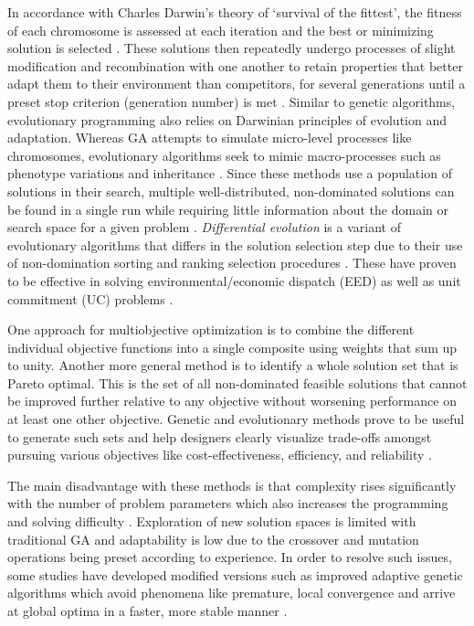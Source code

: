 \documentclass[final,3p,times]{elsarticle}
\begin{document}
In accordance with Charles Darwin's theory of `survival of the fittest', the fitness of each chromosome is assessed at each iteration and the best or minimizing solution is selected \cite{pathak2017}. These solutions then repeatedly undergo processes of slight modification and recombination with one another to retain properties that better adapt them to their environment than competitors, for several generations until a preset stop criterion (generation number) is met \cite{nemati2015}. Similar to genetic algorithms, evolutionary programming also relies on Darwinian principles of evolution and adaptation. Whereas GA attempts to simulate micro-level processes like chromosomes, evolutionary algorithms seek to mimic macro-processes such as phenotype variations and inheritance \cite{pathak2017}. Since these methods use a population of solutions in their search, multiple well-distributed, non-dominated solutions can be found in a single run while requiring little information about the domain or search space for a given problem \cite{Qu2018}. \textit{Differential evolution} is a variant of evolutionary algorithms that differs in the solution selection step due to their use of non-domination sorting and ranking selection procedures \cite{Qu2018}. These have proven to be effective in solving environmental/economic dispatch (EED) as well as unit commitment (UC) problems \cite{lu2011}.

One approach for multiobjective optimization is to combine the different individual objective functions into a single composite using weights that sum up to unity. Another more general method is to identify a whole solution set that is Pareto optimal. This is the set of all non-dominated feasible solutions that cannot be improved further relative to any objective without worsening performance on at least one other objective. Genetic and evolutionary methods prove to be useful to generate such sets and help designers clearly visualize trade-offs amongst pursuing various objectives like cost-effectiveness, efficiency, and reliability \cite{fadaee2012}.

The main disadvantage with these methods is that complexity rises significantly with the number of problem parameters which also increases the programming and solving difficulty \cite{fathima2015}. Exploration of new solution spaces is limited with traditional GA and adaptability is low due to the crossover and mutation operations being preset according to experience. In order to resolve such issues, some studies have developed modified versions such as improved adaptive genetic algorithms which avoid phenomena like premature, local convergence and arrive at global optima in a faster, more stable manner \cite{wu2016}.
\end{document}
